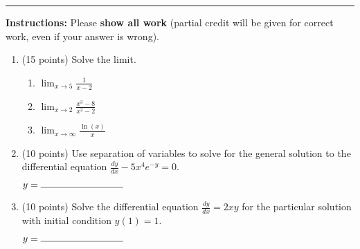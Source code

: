 \documentclass[11pt]{article}
\begin{document}
\Large


\medskip\hrule
\vspace{10pt}

\noindent \textbf{Instructions:} Please \textbf{show all work} (partial credit will be given for correct work, even if your answer is wrong).

\begin{enumerate}

\item (15 points) Solve the limit.

\begin{enumerate}[itemsep=30pt]
    \item $\displaystyle \lim_{x \to 5} \frac{1}{x-2} $
    \item $\displaystyle \lim_{x \to 2} \frac{x^3 - 8}{x^2 - 2} $
    \item $\displaystyle \lim_{x \to \infty} \frac{\ln(x)}{x} $
\end{enumerate}
\vspace{40pt}

\item (10 points) Use separation of variables to solve for the general solution to the differential equation $\displaystyle \frac{dy}{dx} - 5x^4 e^{-y} = 0$.

\vspace{80pt}
\begin{flushright}
$y = \rule{3cm}{0.4pt}$
\end{flushright}

\vspace{20pt}

\item (10 points) Solve the differential equation $\frac{dy}{dx} = 2xy$ for the particular solution with initial condition $y(1) = 1$.

\vspace{80pt}
\begin{flushright}
$y = \rule{3cm}{0.4pt}$
\end{flushright}

\vspace{20pt}

\newpage


\end{enumerate}
\end{document}
